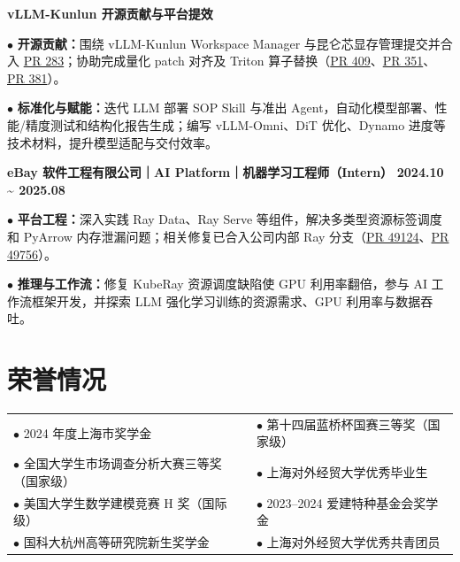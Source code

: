 \documentclass[11pt,a4paper,fontset=none]{ctexart}
\newcommand{\daterange}[1]{{\textbf{#1}}}
\newcommand{\entrytitle}[1]{{\textbf{#1}}}
\begin{document}
\par\noindent
\entrytitle{vLLM-Kunlun 开源贡献与平台提效}

\par\noindent
$\bullet$ \textbf{开源贡献：}围绕 vLLM-Kunlun Workspace Manager 与昆仑芯显存管理提交并合入 \href{https://github.com/baidu/vLLM-Kunlun/pull/283/changes}{PR 283}；协助完成量化 patch 对齐及 Triton 算子替换（\href{https://github.com/baidu/vLLM-Kunlun/pull/409}{PR 409}、\href{https://github.com/baidu/vLLM-Kunlun/pull/351}{PR 351}、\href{https://github.com/baidu/vLLM-Kunlun/pull/381}{PR 381}）。

\par\noindent
$\bullet$ \textbf{标准化与赋能：}迭代 LLM 部署 SOP Skill 与准出 Agent，自动化模型部署、性能/精度测试和结构化报告生成；编写 vLLM-Omni、DiT 优化、Dynamo 进度等技术材料，提升模型适配与交付效率。

\noindent
\entrytitle{eBay 软件工程有限公司｜AI Platform｜机器学习工程师（Intern）}
\hfill\daterange{2024.10 \textasciitilde{} 2025.08}

\par\noindent
$\bullet$ \textbf{平台工程：}深入实践 Ray Data、Ray Serve 等组件，解决多类型资源标签调度和 PyArrow 内存泄漏问题；相关修复已合入公司内部 Ray 分支（\href{https://github.com/ray-project/ray/pull/49124}{PR 49124}、\href{https://github.com/ray-project/ray/pull/49756}{PR 49756}）。

\par\noindent
$\bullet$ \textbf{推理与工作流：}修复 KubeRay 资源调度缺陷使 GPU 利用率翻倍，参与 AI 工作流框架开发，并探索 LLM 强化学习训练的资源需求、GPU 利用率与数据吞吐。

\section*{荣誉情况}
\vspace{-0.1em}

\noindent
\begin{tabularx}{\textwidth}{@{}X X@{}}
    $\bullet$ 2024 年度上海市奖学金 & $\bullet$ 第十四届蓝桥杯国赛三等奖（国家级） \\
    $\bullet$ 全国大学生市场调查分析大赛三等奖（国家级） & $\bullet$ 上海对外经贸大学优秀毕业生 \\
    $\bullet$ 美国大学生数学建模竞赛 H 奖（国际级） & $\bullet$ 2023--2024 爱建特种基金会奖学金 \\
    $\bullet$ 国科大杭州高等研究院新生奖学金 & $\bullet$ 上海对外经贸大学优秀共青团员
\end{tabularx}
\end{document}
